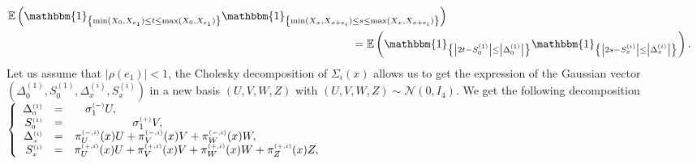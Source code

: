\documentclass[12pt]{article}
\theoremstyle{Theorem}
\begin{document}
{\small
\begin{align*}
\mathbb{E}\left(\mathbbm{1}_{\left\{\min(X_{\scriptscriptstyle 0}, X_{e_1}) \leq t \leq \max(X_{\scriptscriptstyle 0}, X_{e_1})\right\}}\mathbbm{1}_{\left\{\min(X_{\scriptscriptstyle x}, X_{x+e_i}) \leq s \leq \max(X_{\scriptscriptstyle x}, X_{x+e_i}) \right\}}\right)\\
& \hspace{-3cm}= \mathbb{E}\left(\mathbbm{1}_{\left\{ \left|2t - S^{\scriptscriptstyle (1)}_{\scriptscriptstyle 0}\right| \leq \left|\Delta^{\scriptscriptstyle (1)}_{\scriptscriptstyle 0}\right|\right\}}\mathbbm{1}_{\left\{ \left|2s - S^{\scriptscriptstyle (i)}_{\scriptscriptstyle x}\right| \leq \left|\Delta^{\scriptscriptstyle (i)}_x\right| \right\}}\right).
\end{align*}}Let us assume that $|\rho(e_1)| < 1$, the Cholesky decomposition of $\Sigma_{i}(x)$ allows us to get the expression of the Gaussian vector $\left(\Delta^{\scriptscriptstyle (1)}_{\scriptscriptstyle 0},S^{\scriptscriptstyle (1)}_{\scriptscriptstyle 0},\Delta^{\scriptscriptstyle (i)}_{\scriptscriptstyle x},S^{\scriptscriptstyle (i)}_{\scriptscriptstyle x} \right)$ in a new basis $\left(U,V,W,Z\right)$ with $\left(U, V, W, Z\right) \sim \mathcal{N}\left(0,I_{4}\right)$. We get the following decomposition \\ 
$\left\{
  \begin{array}{rlc}
  \Delta^{\scriptscriptstyle (1)}_{\scriptscriptstyle 0} & = & \sigma^{\scriptscriptstyle (-)}_{1}U,  \textcolor{white}{+  \pi^{\scriptscriptstyle(+, i)}_{V}(x) V +  \pi^{\scriptscriptstyle(+, i)}_{W}(x) W +  \pi^{\scriptscriptstyle(+, i)}_{Z}(x)Z, } \\
  S^{\scriptscriptstyle (1)}_{\scriptscriptstyle 0} & = & \textcolor{white}{\sigma^{\scriptscriptstyle (-)}_{1}U,} \sigma^{\scriptscriptstyle (+)}_{1}V, \textcolor{white}{+  \pi^{\scriptscriptstyle(+, i)}_{W}(x) W +  \pi^{\scriptscriptstyle(+, i)}_{Z}(x)Z, } \\
  \Delta^{\scriptscriptstyle (i)}_{\scriptscriptstyle  x}& = &  \pi^{\scriptscriptstyle(-, i)}_{U}(x)U +  \pi^{\scriptscriptstyle(-, i)}_{V}(x) V +  \pi^{\scriptscriptstyle(-, i)}_{W}(x) W, \textcolor{white}{ + \pi^{\scriptscriptstyle(+, i)}_{Z}(x)Z, } \\
  S^{\scriptscriptstyle (i)}_{\scriptscriptstyle x} & = &    \pi^{\scriptscriptstyle(+, i)}_{U}(x)U +  \pi^{\scriptscriptstyle(+, i)}_{V}(x) V +  \pi^{\scriptscriptstyle(+, i)}_{W}(x) W +  \pi^{\scriptscriptstyle(+, i)}_{Z}(x)Z, 
\end{array}\right.$ \\
\end{document}
